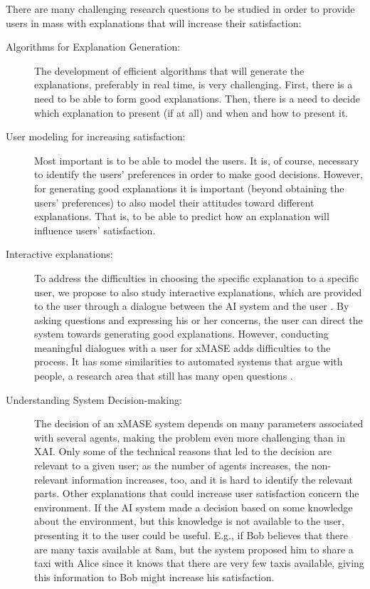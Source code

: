 \documentclass[letterpaper]{article} %
\begin{document}
There are many challenging research questions to be studied in order to provide users in \acp{mas} with explanations that will increase their satisfaction:

\begin{description}
\item[Algorithms for Explanation Generation:] The develop\-ment of efficient algorithms that will generate the explanations, preferably in real time, is very challenging. First, there is a need to be able to form good explanations. Then, there is a need to decide which explanation to present (if at all) and when and how to present it.  
\item[User modeling for increasing satisfaction:] Most important is to be able to model the users. It is, of course, necessary to identify the users' preferences in order to make good decisions. However, for generating good explanations it is important (beyond obtaining the users' preferences) to also model their attitudes toward different explanations. That is, to be able to predict how an explanation will influence users' satisfaction. 
\item[Interactive explanations:]
To address the difficulties in choosing the specific explanation to a specific user, we propose  to also study interactive explanations, which are provided to the user through a dialogue between the AI system and the user \cite{miller2018explanation}. By asking questions and expressing his or her concerns, the user can direct the system towards generating good explanations. However, conducting meaningful dialogues with a user for \ac{xMASE} adds difficulties to the process. It has some similarities to automated systems that argue with people, a research area that still has many open questions \cite{rosenfeld2016providing,rosenfeld2016strategical}.
\item[Understanding System Decision-making:] The decision of an \ac{xMASE} system depends on many parameters associated with several agents, making the problem even more challenging than in \ac{XAI}. Only some of the technical reasons that led to the decision are relevant to a given user; as the number of agents increases, the non-relevant information increases, too, and it is hard to identify the relevant parts. Other explanations that could increase user satisfaction concern the environment. If the AI system made a decision based on some knowledge about the environment, but this knowledge is not available to the user, presenting it to the user could be useful. E.g., if Bob believes that there are many taxis available at 8am, but the system proposed him to share a taxi with Alice since it knows that there are very few taxis available, giving this information to Bob might increase his satisfaction. 

\end{description}
\end{document}
